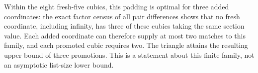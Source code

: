 Within the eight fresh-five cubics, this padding is optimal for three added
coordinates: the exact factor census of all pair differences shows that no
fresh coordinate, including infinity, has three of these cubics taking the
same section value.  Each added coordinate can therefore supply at most two
matches to this family, and each promoted cubic requires two.  The triangle
attains the resulting upper bound of three promotions.  This is a statement
about this finite family, not an asymptotic list-size lower bound.
